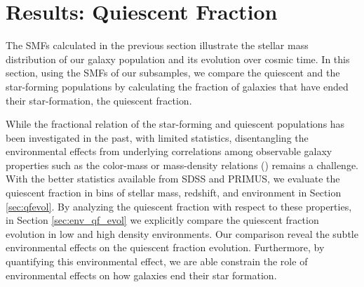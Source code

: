 \documentclass{emulateapj}
\begin{document}
\section{Results: Quiescent Fraction} \label{sec:qf_const}
The SMFs calculated in the previous section illustrate the stellar
mass distribution of our galaxy population and its evolution over
cosmic time. In this section, using the SMFs of our subsamples, we
compare the quiescent and the star-forming populations by calculating
the fraction of galaxies that have ended their star-formation, the quiescent fraction. 

While the fractional relation of the star-forming and quiescent
populations has been investigated in the past, with limited
statistics, disentangling the environmental effects from underlying
correlations among observable galaxy properties such as the color-mass
or mass-density relations (\citealt{Cooper:2010aa}) remains a 
challenge. With the better statistics available from SDSS and
PRIMUS, we evaluate the quiescent fraction in bins of stellar mass,
redshift, and environment in Section \ref{sec:qfevol}. By analyzing
the quiescent fraction with respect to these properties, in Section
\ref{sec:env_qf_evol} we explicitly compare the quiescent fraction
evolution in low and high density environments. Our comparison reveal
the subtle environmental effects on the quiescent fraction
evolution. Furthermore, by quantifying this environmental effect, we
are able constrain the role of environmental effects on how galaxies
end their star formation.
\end{document}
